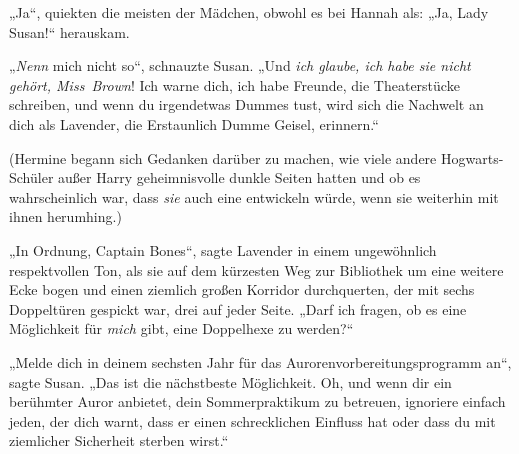 „Ja“, quiekten die meisten der Mädchen, obwohl es bei Hannah als:
„Ja, Lady Susan!“ herauskam.

„\emph{Nenn} mich nicht so“, schnauzte Susan.
„Und \emph{ich glaube, ich habe sie nicht gehört, Miss~Brown}! Ich warne dich, ich habe Freunde, die Theaterstücke schreiben, und wenn du irgendetwas Dummes tust, wird sich die Nachwelt an dich als Lavender, die Erstaunlich Dumme Geisel, erinnern.“

(Hermine begann sich Gedanken darüber zu machen, wie viele andere Hogwarts-Schüler außer Harry geheimnisvolle dunkle Seiten hatten und ob es wahrscheinlich war, dass \emph{sie} auch eine entwickeln würde, wenn sie weiterhin mit ihnen herumhing.)

„In Ordnung, Captain Bones“, sagte Lavender in einem ungewöhnlich respektvollen Ton, als sie auf dem kürzesten Weg zur Bibliothek um eine weitere Ecke bogen und einen ziemlich großen Korridor durchquerten, der mit sechs Doppeltüren gespickt war, drei auf jeder Seite.
„Darf ich fragen, ob es eine Möglichkeit für \emph{mich} gibt, eine Doppelhexe zu werden?“

„Melde dich in deinem sechsten Jahr für das Aurorenvorbereitungsprogramm an“, sagte Susan.
„Das ist die nächstbeste Möglichkeit. Oh, und wenn dir ein berühmter Auror anbietet, dein Sommerpraktikum zu betreuen, ignoriere einfach jeden, der dich warnt, dass er einen schrecklichen Einfluss hat oder dass du mit ziemlicher Sicherheit sterben wirst.“

